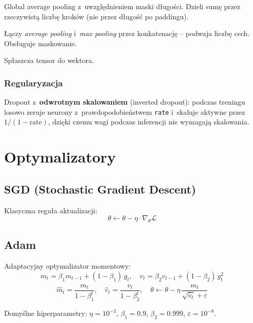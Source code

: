 \documentclass[12pt,a4paper]{article}
\begin{document}
\begin{description}[leftmargin=3cm]
  \item[\texttt{MaskedGlobalAveragePool1D}] Global average pooling z~uwzględnieniem maski długości. Dzieli sumę przez rzeczywistą liczbę kroków (nie przez długość po paddingu).
  \item[\texttt{GlobalConcatPool1D}] Łączy \emph{average pooling} i~\emph{max pooling} przez konkatenację -- podwaja liczbę cech. Obsługuje maskowanie.
  \item[\texttt{Flatten}] Spłaszcza tensor do wektora.
\end{description}

\subsubsection*{Regularyzacja}

\begin{description}[leftmargin=3cm]
  \item[\texttt{Dropout}] Dropout z~\textbf{odwrotnym skalowaniem} (inverted dropout): podczas treningu losowo zeruje neurony z~prawdopodobieństwem \texttt{rate} i~skaluje aktywne przez $1/(1-\text{rate})$, dzięki czemu wagi podczas inferencji nie wymagają skalowania.
\end{description}

\section{Optymalizatory}

\subsection{SGD (Stochastic Gradient Descent)}
Klasyczna reguła aktualizacji:
\[
  \theta \leftarrow \theta - \eta \cdot \nabla_\theta \mathcal{L}
\]

\subsection{Adam}
Adaptacyjny optymalizator momentowy:
\[
  m_t = \beta_1 m_{t-1} + (1-\beta_1)\,g_t, \quad
  v_t = \beta_2 v_{t-1} + (1-\beta_2)\,g_t^2
\]
\[
  \hat{m}_t = \frac{m_t}{1-\beta_1^t}, \quad
  \hat{v}_t = \frac{v_t}{1-\beta_2^t}, \quad
  \theta \leftarrow \theta - \eta\,\frac{\hat{m}_t}{\sqrt{\hat{v}_t}+\varepsilon}
\]

Domyślne hiperparametry: $\eta=10^{-3}$, $\beta_1=0.9$, $\beta_2=0.999$, $\varepsilon=10^{-8}$.
\end{document}
